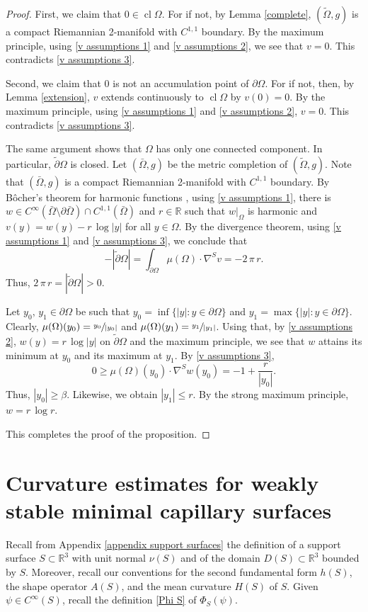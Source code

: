 \documentclass[11pt]{amsart}
\begin{document}
\begin{proof}
	
	First, we claim that $0\in \operatorname{cl}\Omega$. For if not, by Lemma \ref{complete},   $(\tilde \Omega,g)$ is a compact Riemannian 2-manifold with $C^{1,1}$ boundary. By the  maximum principle, using \eqref{v assumptions 1} and \eqref{v assumptions 2}, we see that $v=0$. This contradicts \eqref{v assumptions 3}.
	
	Second, we claim that $0$ is not an accumulation point of $\partial \Omega$. For if not, then, by Lemma \ref{extension}, $v$ extends continuously to $\operatorname{cl}\Omega$ by  $v(0)=0$. By the  maximum principle, using \eqref{v assumptions 1} and \eqref{v assumptions 2}, $v=0$. This contradicts \eqref{v assumptions 3}.

   The same argument shows that $\Omega$ has only one connected component. In particular, $\tilde \partial\Omega$ is  closed.  Let $(\bar \Omega, g)$ be the metric completion of $(\tilde \Omega,g)$. Note that $(\bar \Omega,g)$ is a compact Riemannian 2-manifold with $C^{1,1}$ boundary. 
By B\^ocher's theorem for harmonic functions \cite{Bocher}, using \eqref{v assumptions 1}, there is  $w\in C^\infty( \bar \Omega\setminus \partial \bar \Omega)\cap C^{1,1}(\bar \Omega)$ and $r\in \mathbb{R}$ such that $w|_{\Omega}$ is harmonic and $v(y)=w(y)-r\,\log|y|$ for all $y\in \Omega$. By the divergence theorem, using \eqref{v assumptions 1} and \eqref{v assumptions 3}, we conclude that  
	$$
	-|\tilde \partial\Omega|=\int_{\tilde \partial\Omega}\mu( \Omega)\cdot \nabla^S v
	=-2\,\pi\,r.
	$$
	Thus, $2\,\pi\,r=|\tilde \partial \Omega|>0$. 
	
	Let $y_0,\,y_1\in \partial \Omega$ be such that $y_0=\inf \{|y|:y\in \partial \Omega\}$ and $y_1=\max \{|y|:y\in \partial \Omega\}$. Clearly, $\mu( \Omega)(y_0)=\sfrac{y_0}{|y_0|}$ and $\mu( \Omega)(y_1)=\sfrac{y_1}{|y_1|}$. Using that, by \eqref{v assumptions 2}, $w(y)=r\,\log|y|$ on $\tilde \partial \Omega$ and the maximum principle, we see that $w$ attains its minimum at $y_0$ and its maximum at $y_1$. By \eqref{v assumptions 3}, 
	$$
	0\geq \mu({ \Omega})(y_0)\cdot \nabla^Sw(y_0) =-1+\frac{r}{|y_0|}.	$$
	Thus, $|y_0|\geq \beta$. Likewise, we obtain $|y_1|\leq r$. By the strong maximum principle,  $w=r\,\log r$.
	
	This completes the proof of the proposition. 
\end{proof}



\section{Curvature estimates for weakly stable minimal capillary surfaces}
	Recall from Appendix \ref{appendix support surfaces} the definition of a support surface $S\subset \mathbb{R}^3$ with unit normal $\nu(S)$ and of the domain $D(S)\subset \mathbb{R}^3$ bounded by $S$.  Moreover, recall  our conventions for the second fundamental form $h(S)$, the shape operator $A(S)$, and the mean curvature $H(S)$ of $S$. Given $\psi \in C^\infty(S)$, recall the definition \eqref{Phi S} of $\Phi_S(\psi)$.
\end{document}

